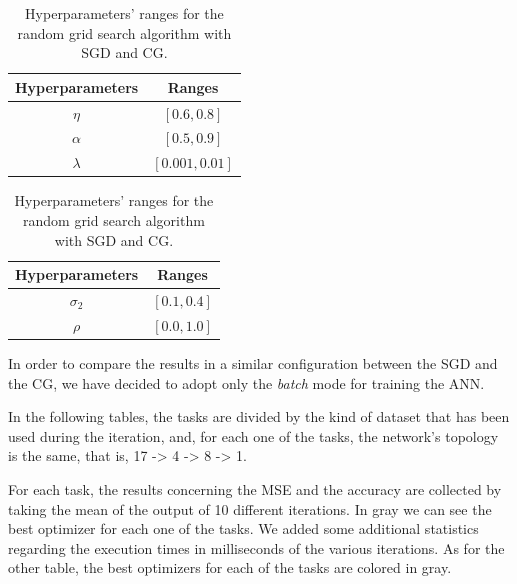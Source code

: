         \begin{table}[H]
          \centering
          \caption{Hyperparameters' ranges for the random grid search algorithm with SGD and CG.}
          \begin{minipage}{.4\textwidth}
              \centering
              \begin{tabular}{| c | c |}
                    \hline
                    Hyperparameters & Ranges\\
                    \hline
                    $\eta$ & $\left [0.6, 0.8 \right ]$ \\
                    \hline
                    $\alpha$ & $[0.5, 0.9]$ \\
                    \hline
                    $\lambda$ & $[0.001, 0.01]$ \\
                    \hline
              \end{tabular}
          \end{minipage}
          \begin{minipage}{.4\textwidth}
              \centering
              \begin{tabular}{| c | c |}
                    \hline
                    Hyperparameters & Ranges\\
                    \hline
                    $\sigma_2$ & $\left [0.1, 0.4 \right ]$ \\
                    \hline
                    $\rho$ & $[0.0, 1.0]$ \\
                    \hline
              \end{tabular}
            \end{minipage}
            \label{tab:hyper_monk}
        \end{table}

        In order to compare the
        results in a similar configuration between the SGD and the CG, we have decided to adopt only the \textit{batch} mode for training the ANN.

        In the following tables, the tasks are divided by the kind of dataset that has been used during the iteration, and, for
        each one of the tasks, the network's topology is the same, that is, 17 -> 4 -> 8 -> 1.

        For each
        task, the results concerning the MSE and the accuracy are collected by taking the mean of the
        output of 10 different iterations. In gray we can see the best optimizer for each one of the
        tasks. We added some additional statistics
        regarding the execution times in milliseconds of the various iterations. As for the other table, the best
        optimizers for each of the tasks are colored in gray.

